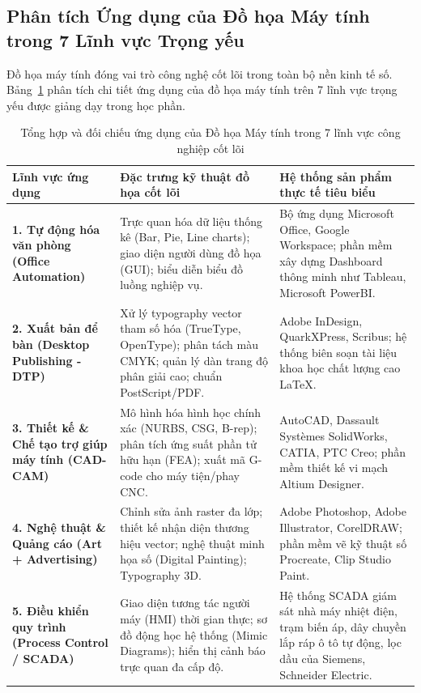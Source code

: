 \subsection{Phân tích Ứng dụng của Đồ họa Máy tính trong 7 Lĩnh vực Trọng yếu}

Đồ họa máy tính đóng vai trò công nghệ cốt lõi trong toàn bộ nền kinh tế số. Bảng~\ref{tab:cg_applications_detailed} phân tích chi tiết ứng dụng của đồ họa máy tính trên 7 lĩnh vực trọng yếu được giảng dạy trong học phần.

\begin{table}[ht]
\centering
\small
\caption{Tổng hợp và đối chiếu ứng dụng của Đồ họa Máy tính trong 7 lĩnh vực công nghiệp cốt lõi}
\label{tab:cg_applications_detailed}
\renewcommand{\arraystretch}{1.3}
\begin{tabularx}{\textwidth}{|p{3.2cm}|X|X|}
\hline
\textbf{Lĩnh vực ứng dụng} & \textbf{Đặc trưng kỹ thuật đồ họa cốt lõi} & \textbf{Hệ thống sản phẩm thực tế tiêu biểu} \\
\hline
\textbf{1. Tự động hóa văn phòng (Office Automation)} & Trực quan hóa dữ liệu thống kê (Bar, Pie, Line charts); giao diện người dùng đồ họa (GUI); biểu diễn biểu đồ luồng nghiệp vụ. & Bộ ứng dụng Microsoft Office, Google Workspace; phần mềm xây dựng Dashboard thông minh như Tableau, Microsoft PowerBI. \\
\hline
\textbf{2. Xuất bản để bàn (Desktop Publishing - DTP)} & Xử lý typography vector tham số hóa (TrueType, OpenType); phân tách màu CMYK; quản lý dàn trang độ phân giải cao; chuẩn PostScript/PDF. & Adobe InDesign, QuarkXPress, Scribus; hệ thống biên soạn tài liệu khoa học chất lượng cao \LaTeX. \\
\hline
\textbf{3. Thiết kế \& Chế tạo trợ giúp máy tính (CAD-CAM)} & Mô hình hóa hình học chính xác (NURBS, CSG, B-rep); phân tích ứng suất phần tử hữu hạn (FEA); xuất mã G-code cho máy tiện/phay CNC. & AutoCAD, Dassault Systèmes SolidWorks, CATIA, PTC Creo; phần mềm thiết kế vi mạch Altium Designer. \\
\hline
\textbf{4. Nghệ thuật \& Quảng cáo (Art + Advertising)} & Chỉnh sửa ảnh raster đa lớp; thiết kế nhận diện thương hiệu vector; nghệ thuật minh họa số (Digital Painting); Typography 3D. & Adobe Photoshop, Adobe Illustrator, CorelDRAW; phần mềm vẽ kỹ thuật số Procreate, Clip Studio Paint. \\
\hline
\textbf{5. Điều khiển quy trình (Process Control / SCADA)} & Giao diện tương tác người máy (HMI) thời gian thực; sơ đồ động học hệ thống (Mimic Diagrams); hiển thị cảnh báo trực quan đa cấp độ. & Hệ thống SCADA giám sát nhà máy nhiệt điện, trạm biến áp, dây chuyền lắp ráp ô tô tự động, lọc dầu của Siemens, Schneider Electric. \\

\end{tabularx}
\end{table}
